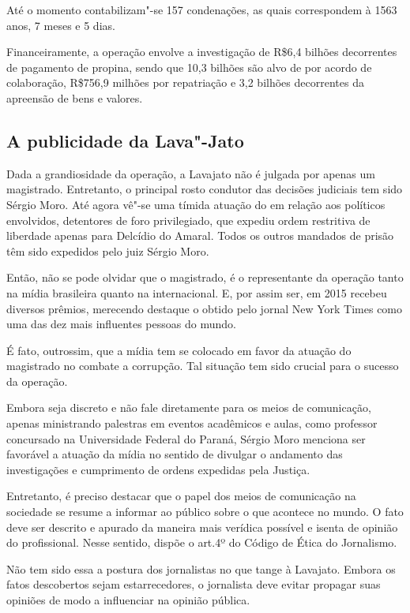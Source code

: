 Até o momento contabilizam"-se 157 condenações, as quais correspondem à
1563 anos, 7 meses e 5 dias.

Financeiramente, a operação envolve a investigação de R\$6,4 bilhões
decorrentes de pagamento de propina, sendo que 10,3 bilhões são alvo de
por acordo de colaboração, R\$756,9 milhões por repatriação e 3,2
bilhões decorrentes da apreensão de bens e valores.

\subsection{A publicidade da Lava"-Jato}

Dada a grandiosidade da operação, a Lavajato não é julgada por apenas um
magistrado. Entretanto, o principal rosto condutor das decisões
judiciais tem sido Sérgio Moro. Até agora vê"-se uma tímida atuação do
 em relação aos políticos envolvidos, detentores de foro
privilegiado, que expediu ordem restritiva de liberdade apenas para
Delcídio do Amaral. Todos os outros mandados de prisão têm sido
expedidos pelo juiz Sérgio Moro.

Então, não se pode olvidar que o magistrado, é o representante da
operação tanto na mídia brasileira quanto na internacional. E, por assim
ser, em 2015 recebeu diversos prêmios, merecendo destaque o obtido pelo
jornal New York Times como uma das dez mais influentes pessoas do mundo.

É fato, outrossim, que a mídia tem se colocado em favor da atuação do
magistrado no combate a corrupção. Tal situação tem sido crucial para o
sucesso da operação.

Embora seja discreto e não fale diretamente para os meios de
comunicação, apenas ministrando palestras em eventos acadêmicos e aulas,
como professor concursado na Universidade Federal do Paraná, Sérgio Moro
menciona ser favorável a atuação da mídia no sentido de divulgar o
andamento das investigações e cumprimento de ordens expedidas pela
Justiça.

Entretanto, é preciso destacar que o papel dos meios de comunicação na
sociedade se resume a informar ao público sobre o que acontece no mundo.
O fato deve ser descrito e apurado da maneira mais verídica possível e
isenta de opinião do profissional. Nesse sentido, dispõe o art.4º do
Código de Ética do Jornalismo.

Não tem sido essa a postura dos jornalistas no que tange à Lavajato.
Embora os fatos descobertos sejam estarrecedores, o jornalista deve
evitar propagar suas opiniões de modo a influenciar na opinião pública.

